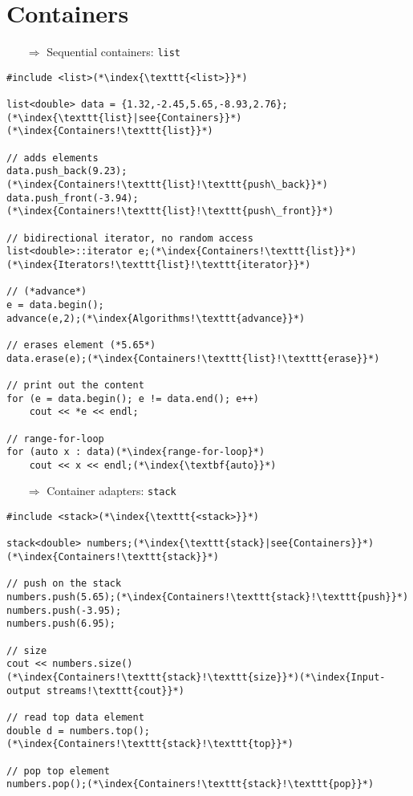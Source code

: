 \documentclass[10pt]{book}
\begin{document}
\section{Containers}
\begin{enumerate}
\item[$\Rightarrow$] Sequential containers: \texttt{list}
\end{enumerate}
\begin{lstlisting}
#include <list>(*\index{\texttt{<list>}}*)

list<double> data = {1.32,-2.45,5.65,-8.93,2.76};(*\index{\texttt{list}|see{Containers}}*)(*\index{Containers!\texttt{list}}*)

// adds elements
data.push_back(9.23);(*\index{Containers!\texttt{list}!\texttt{push\_back}}*)
data.push_front(-3.94);(*\index{Containers!\texttt{list}!\texttt{push\_front}}*)

// bidirectional iterator, no random access    
list<double>::iterator e;(*\index{Containers!\texttt{list}}*)(*\index{Iterators!\texttt{list}!\texttt{iterator}}*)

// (*advance*)
e = data.begin();
advance(e,2);(*\index{Algorithms!\texttt{advance}}*)

// erases element (*5.65*)
data.erase(e);(*\index{Containers!\texttt{list}!\texttt{erase}}*)

// print out the content    
for (e = data.begin(); e != data.end(); e++)
    cout << *e << endl;
    
// range-for-loop
for (auto x : data)(*\index{range-for-loop}*)
    cout << x << endl;(*\index{\textbf{auto}}*)
\end{lstlisting}
\begin{enumerate}
\item[$\Rightarrow$] Container adapters: \texttt{stack}
\end{enumerate}
\begin{lstlisting}
#include <stack>(*\index{\texttt{<stack>}}*)

stack<double> numbers;(*\index{\texttt{stack}|see{Containers}}*)(*\index{Containers!\texttt{stack}}*)

// push on the stack
numbers.push(5.65);(*\index{Containers!\texttt{stack}!\texttt{push}}*)
numbers.push(-3.95);
numbers.push(6.95);

// size
cout << numbers.size()(*\index{Containers!\texttt{stack}!\texttt{size}}*)(*\index{Input-output streams!\texttt{cout}}*)

// read top data element
double d = numbers.top();(*\index{Containers!\texttt{stack}!\texttt{top}}*)

// pop top element
numbers.pop();(*\index{Containers!\texttt{stack}!\texttt{pop}}*)
\end{lstlisting}
\end{document}
